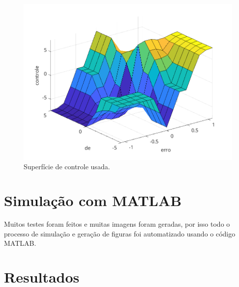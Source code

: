 \documentclass[12pt]{article}
\begin{document}
\begin{figure}
  \centering
  \includegraphics{fig/fuzzy_surface.png}
  \caption{Superfície de controle usada.}
  \label{fig:superficie}
\end{figure}

\section{Simulação com MATLAB}

Muitos testes foram feitos e muitas imagens foram geradas, por isso todo o processo de simulação e geração de figuras foi automatizado usando o código MATLAB.





\section{Resultados}



\printglossary[type=\acronymtype]
\printglossary
\end{document}

